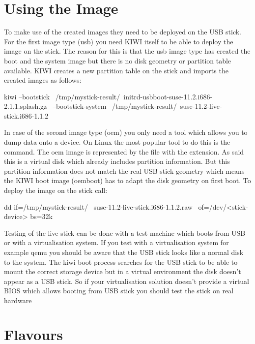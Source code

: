 \section{Using the Image}

To make use of the created images they need to be deployed on the
USB stick. For the first image type (usb) you need KIWI itself to
be able to deploy the image on the stick. The reason for this is
that the usb image type has created the boot and the system image
but there is no disk geometry or partition table available. KIWI
creates a new partition table on the stick and imports the created
images as follows:

\begin{Command}{13cm}
kiwi --bootstick \
   /tmp/mystick-result/\
   initrd-usbboot-suse-11.2.i686-2.1.1.splash.gz \
   --bootstick-system \
   /tmp/mystick-result/\
   suse-11.2-live-stick.i686-1.1.2
\end{Command}

In case of the second image type (oem) you only need a tool which allows
you to dump data onto a device. On Linux the most popular tool to do this
is the \cmd{dd} command. The oem image is represented by the file
with the  extension. As said this is a virtual disk which already
includes partition information. But this partition information does
not match the real USB stick geometry which means the KIWI boot image
(oemboot) has to adapt the disk geometry on first boot. To deploy the
image on the stick call:

\begin{Command}{13cm}
dd if=/tmp/mystick-result/ \
   suse-11.2-live-stick.i686-1.1.2.raw \
   of=/dev/<stick-device> bs=32k
\end{Command}

Testing of the live stick can be done with a test machine which boots from
USB or with a virtualisation system. If you test with a virtualisation
system for example qemu you should be aware that the USB stick looks like
a normal disk to the system. The kiwi boot process searches for the USB
stick to be able to mount the correct storage device but in a virtual
environment the disk doesn't appear as a USB stick. So if your
virtualisation solution doesn't provide a virtual BIOS which allows booting
from USB stick you should test the stick on real hardware

\section{Flavours}

